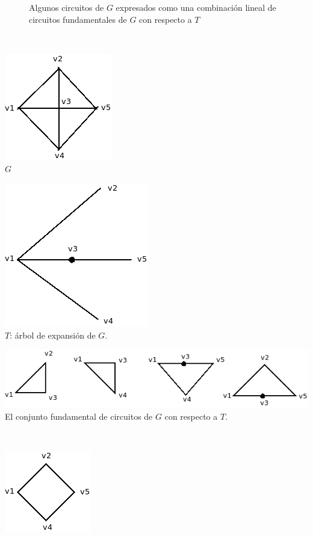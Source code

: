 \documentclass[10pt,a5paper]{book}
\begin{document}
\begin{figure}[H]
\caption{Algunos circuitos de $G$ expresados como una combinación lineal de circuitos fundamentales de $G$ con respecto a $T$}
\end{figure}
\hrulefill{}\\
\parbox{6cm}
{
  \includegraphics[scale=.5]{Fig2_8_1.png}\\
  \hspace*{.5in}$G$
}
\hspace*{-.2in}\parbox{6cm}
{
  \includegraphics[scale=.6]{Fig2_8_2.png}\\
  $T$: árbol de expansión de $G$.
}\hfill
\hspace*{-.5in}\parbox{10cm}
{
  \includegraphics[scale=.6]{Fig2_8_3.png}\\
 \hspace*{.25in} El conjunto fundamental de circuitos de $G$ con respecto a $T$.
}\hfill\\
\hspace*{-.3in}\parbox{3cm}
{
\includegraphics[scale=.6]{Fig2_8_4.png} 
}
\end{document}
